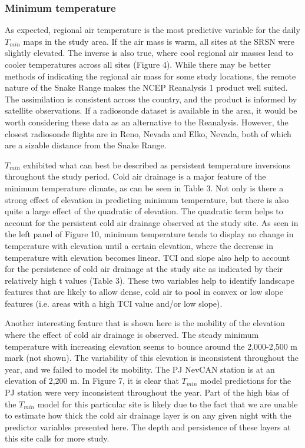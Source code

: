 \documentclass{ametsoc}
\begin{document}
\subsubsection{Minimum temperature}
As expected, regional air temperature is the most predictive variable for the
daily $T_{min}$ maps in the study area. If the air mass is warm, all sites at
the SRSN were slightly elevated. The inverse is also true, where cool regional
air masses lead to cooler temperatures across all sites (Figure 4). While there
may be better methods of indicating the regional air mass for some study
locations, the remote nature of the Snake Range makes the NCEP Reanalysis 1
product well suited. The assimilation is consistent across the country, and the
product is informed by satellite observations. If a radiosonde dataset is
available in the area, it would be worth considering these data as an
alternative to the Reanalysis. However, the closest radiosonde flights are in
Reno, Nevada and Elko, Nevada, both of which are a sizable distance from the
Snake Range.

$T_{min}$ exhibited what can best be described as persistent temperature
inversions throughout the study period. Cold air drainage is a major feature of
the minimum temperature climate, as can be seen in Table 3. Not only is there a
strong effect of elevation in predicting minimum temperature, but there is also
quite a large effect of the quadratic of elevation. The quadratic term helps to
account for the persistent cold air drainage observed at the study site. As seen
in the left panel of Figure 10, minimum temperature tends to display no change
in temperature with elevation until a certain elevation, where the decrease in
temperature with elevation becomes linear. TCI and slope also help to account
for the persistence of cold air drainage at the study site as indicated by their
relatively high t values (Table 3). These two variables help to identify
landscape features that are likely to allow dense, cold air to pool in convex or
low slope features (i.e. areas with a high TCI value and/or low slope).

Another interesting feature that is shown here is the mobility of the elevation
where the effect of cold air drainage is observed. The steady minimum
temperature with increasing elevation seems to bounce around the 2,000-2,500 m
mark (not shown). The variability of this elevation is inconsistent throughout
the year, and we failed to model its mobility. The PJ NevCAN station is at an
elevation of 2,200 m. In Figure 7, it is clear that $T_{min}$ model predictions
for the PJ station were very inconsistent throughout the year. Part of the high
bias of the $T_{min}$ model for this particular site is likely due to the fact
that we are unable to estimate how thick the cold air drainage layer is on any
given night with the predictor variables presented here. The depth and
persistence of these layers at this site calls for more study.
\end{document}
